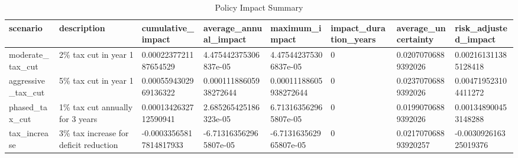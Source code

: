 \begin{sidewaystable}
\caption{Policy Impact Summary}
\begin{tabular}{|l|l|l|l|l|l|l|l|}
\hline
scenario & description & cumulative\_impact & average\_annual\_impact & maximum\_impact & impact\_duration\_years & average\_uncertainty & risk\_adjusted\_impact \\
\hline
moderate\_tax\_cut & 2\% tax cut in year 1 & 0.0002237721187654529 & 4.475442375306837e-05 & 4.475442375306837e-05 & 0 & 0.02070706889392026 & 0.002161311385128418 \\
aggressive\_tax\_cut & 5\% tax cut in year 1 & 0.0005594302969136322 & 0.00011188605938272644 & 0.00011188605938272644 & 0 & 0.02370706889392026 & 0.004719523104411272 \\
phased\_tax\_cut & 1\% tax cut annually for 3 years & 0.0001342632712590941 & 2.685265425186323e-05 & 6.713163562965807e-05 & 0 & 0.01990706889392026 & 0.001348900453148288 \\
tax\_increase & 3\% tax increase for deficit reduction & -0.00033565817814817933 & -6.713163562965807e-05 & -6.713163562965807e-05 & 0 & 0.021707068893920257 & -0.003092616325019376 \\
\hline
\end{tabular}
\end{sidewaystable}


